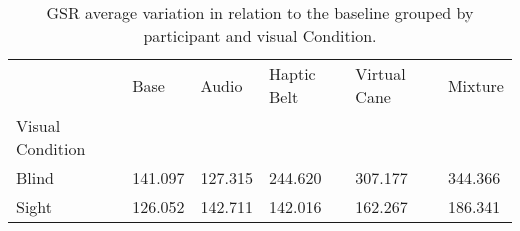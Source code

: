 
\begin{table}[!htb]
\centering
\caption{GSR average variation in relation to the baseline grouped by participant and visual Condition.}
\label{tab:gsr_var_average_group}
\begin{tabular}{llllll}
\toprule
{} &    Base &   Audio &  Haptic Belt &  Virtual Cane &  Mixture \\
Visual Condition &         &         &              &               &          \\
\midrule
Blind            & 141.097 & 127.315 &      244.620 &       307.177 &  344.366 \\
Sight            & 126.052 & 142.711 &      142.016 &       162.267 &  186.341 \\
\bottomrule
\end{tabular}
\end{table}

